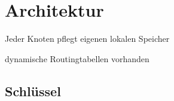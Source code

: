 \section{Architektur}
Jeder Knoten pflegt eigenen lokalen Speicher

dynamische Routingtabellen vorhanden
\subsection{Schlüssel}

